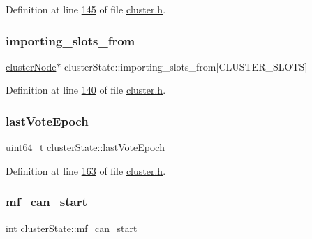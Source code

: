 Definition at line \hyperlink{cluster_8h_source_l00145}{145} of file \hyperlink{cluster_8h_source}{cluster.\+h}.

\mbox{\label{structclusterState_a63639e9efbfdc877fa58a42d5609e49a}} 
\subsubsection{\texorpdfstring{importing\+\_\+slots\+\_\+from}{importing\_slots\_from}}
{\footnotesize\ttfamily \hyperlink{structclusterNode}{cluster\+Node}$\ast$ cluster\+State\+::importing\+\_\+slots\+\_\+from\mbox{[}C\+L\+U\+S\+T\+E\+R\+\_\+\+S\+L\+O\+TS\mbox{]}}



Definition at line \hyperlink{cluster_8h_source_l00140}{140} of file \hyperlink{cluster_8h_source}{cluster.\+h}.

\mbox{\label{structclusterState_a94332a392b06214e98b82e5470fbff86}} 
\subsubsection{\texorpdfstring{last\+Vote\+Epoch}{lastVoteEpoch}}
{\footnotesize\ttfamily uint64\+\_\+t cluster\+State\+::last\+Vote\+Epoch}



Definition at line \hyperlink{cluster_8h_source_l00163}{163} of file \hyperlink{cluster_8h_source}{cluster.\+h}.

\mbox{\label{structclusterState_a936611435312046bab0e1606ff815528}} 
\subsubsection{\texorpdfstring{mf\+\_\+can\+\_\+start}{mf\_can\_start}}
{\footnotesize\ttfamily int cluster\+State\+::mf\+\_\+can\+\_\+start}



